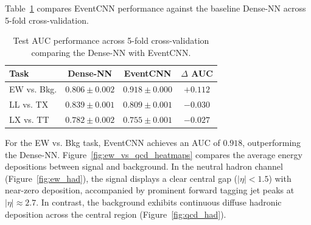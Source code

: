 \documentclass[12pt]{article}
\begin{document}
        Table~\ref{tab:cnn_cv_benchmark} compares EventCNN performance against the baseline Dense-NN across 5-fold cross-validation.

        \begin{table}[htbp]
            \centering
            \small
            \caption{Test AUC performance across 5-fold cross-validation comparing the Dense-NN with EventCNN.}
            \label{tab:cnn_cv_benchmark}
            \begin{tabular}{lccc}
                \toprule
                \textbf{Task} & \textbf{Dense-NN} & \textbf{EventCNN} & \textbf{$\Delta$ AUC} \\
                \midrule
                EW vs. Bkg. & $0.806 \pm 0.002$ & $\mathbf{0.918 \pm 0.000}$ & $+0.112$ \\
                LL vs. TX & $\mathbf{0.839 \pm 0.001}$ & $0.809 \pm 0.001$ & $-0.030$ \\
                LX vs. TT & $\mathbf{0.782 \pm 0.002}$ & $0.755 \pm 0.001$ & $-0.027$ \\
                \bottomrule
            \end{tabular}
        \end{table}

        For the EW vs. Bkg task, EventCNN achieves an AUC of $0.918$, outperforming the Dense-NN. Figure~\ref{fig:ew_vs_qcd_heatmaps} compares the average energy depositions between signal and background. In the neutral hadron channel (Figure~\ref{fig:ew_had}), the signal displays a clear central gap ($|\eta| < 1.5$) with near-zero deposition, accompanied by prominent forward tagging jet peaks at $|\eta| \approx 2.7$. In contrast, the background exhibits continuous diffuse hadronic deposition across the central region (Figure~\ref{fig:qcd_had}).
\end{document}
